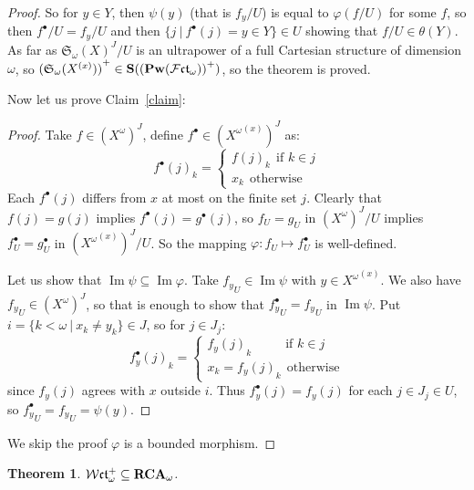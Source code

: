 \documentclass{article}
\theoremstyle{defin}
\theoremstyle{theorem}
\newtheorem{theorem}{Theorem}
\theoremstyle{claim}
\theoremstyle{prop}
\theoremstyle{lemma}
\theoremstyle{fact}
\theoremstyle{remark}
\theoremstyle{ex}
\theoremstyle{col}
\theoremstyle{question}
\begin{document}
\begin{proof}
So for $y \in Y$, then $\psi(y)$ (that is $f_y/U$) is equal to $\varphi(f/U)$ for some $f$, 
so then $f^{\bullet}/U = f_y/U$ and then $\{ j \: | \: f^{\bullet}(j) = y \in Y \} \in U$ 
showing that $f/U \in \theta(Y)$. 
As far as $\mathfrak{S}_{\omega}{(X)}^J/U$ is an ultrapower of a full Cartesian structure of dimension 
$\omega$, so ${(\mathfrak{S}_{\omega}(X^{(x)}))}^+ \in {\bf S} ({({\bf Pw}(\mathcal{F}\mathfrak{ct}_{\omega}))}^+)$, so the theorem is proved.

Now let us prove Claim~\ref{claim}:
\begin{proof}
Take $f \in (X^{\omega})^J$, define $f^{\bullet} \in {({X^{\omega}}^{(x)})}^J$ as:
\begin{equation}
    f^{\bullet}(j)_k = \begin{cases}
        {f(j)}_k \:\: \text{if $k \in j$} \\
        x_k \:\: \text{otherwise}
    \end{cases}
\end{equation}
Each $f^{\bullet}(j)$ differs from $x$ at most on the finite set $j$. Clearly that $f(j) = g(j)$ implies $f^{\bullet}(j) = g^{\bullet}(j)$, 
so $f_U = g_U$ in ${(X^{\omega})}^J/U$ implies $f^{\bullet}_U = g^{\bullet}_U$ in 
${({X^{\omega}}^{(x)})}^J/U$. So the mapping $\varphi : f_U \mapsto f^{\bullet}_U$ is well-defined.

Let us show that $\operatorname{Im}\psi \subseteq \operatorname{Im}\varphi$. 
Take ${f_y}_U \in \operatorname{Im}\psi$ with $y \in {X^{\omega}}^{(x)}$. 
We also have ${f_y}_U \in {(X^{\omega})}^J$, so that is enough to show that 
${f^{\bullet}_y}_U = {f_y}_U$ in $\operatorname{Im}\psi$. Put $i = \{ k < \omega \: | \: x_k \neq y_k \} \in J$, 
so for $j \in J_j$:
\begin{equation}
    {f^{\bullet}_y(j)}_k = \begin{cases}
        {f_y(j)}_k \:\:\:\:\:\:\:\:\:\:\:\: \text{if $k \in j$} \\
        x_k = {f_y(j)}_k \:\: \text{otherwise}
    \end{cases}
\end{equation}
since $f_y(j)$ agrees with $x$ outside $i$. Thus $f^{\bullet}_y(j) = f_y(j)$ for each $j \in J_j \in U$,
so ${f^{\bullet}_y}_U = {f_y}_U = \psi(y)$.
\end{proof}

We skip the proof $\varphi$ is a bounded morphism. 
\end{proof}

\begin{theorem}
$\mathcal{W}\mathfrak{ct}_{\omega}^+ \subseteq {\bf RCA}_{\omega}$.
\end{theorem}
\end{document}
